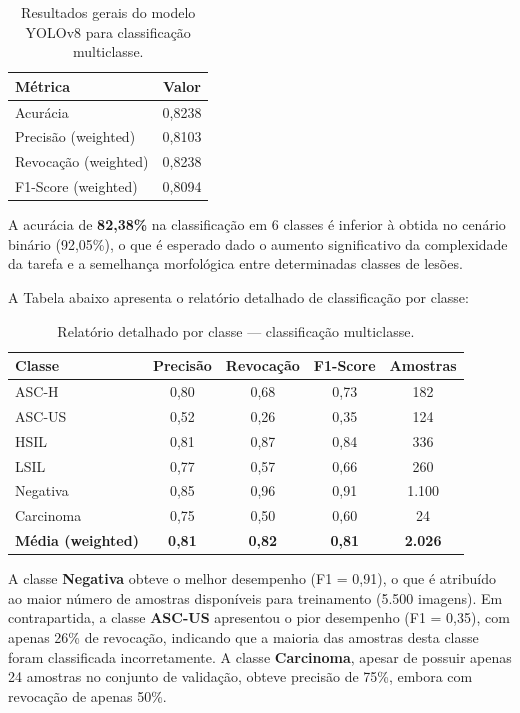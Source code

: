 \documentclass[12pt, a4paper]{article}
\begin{document}
\begin{table}[H]
\centering
\caption{Resultados gerais do modelo YOLOv8 para classificação multiclasse.}
\label{tab:res_multi}
\begin{tabular}{lc}
\toprule
\textbf{Métrica} & \textbf{Valor} \\
\midrule
Acurácia              & 0,8238 \\
Precisão (weighted)   & 0,8103 \\
Revocação (weighted)  & 0,8238 \\
F1-Score (weighted)   & 0,8094 \\
\bottomrule
\end{tabular}
\end{table}

A acurácia de \textbf{82,38\%} na classificação em 6 classes é inferior à obtida no cenário binário (92,05\%), o que é esperado dado o aumento significativo da complexidade da tarefa e a semelhança morfológica entre determinadas classes de lesões.

A Tabela abaixo apresenta o relatório detalhado de classificação por classe:

\begin{table}[H]
\centering
\caption{Relatório detalhado por classe --- classificação multiclasse.}
\label{tab:detalhado_multi}
\begin{tabular}{lcccc}
\toprule
\textbf{Classe} & \textbf{Precisão} & \textbf{Revocação} & \textbf{F1-Score} & \textbf{Amostras} \\
\midrule
ASC-H     & 0,80 & 0,68 & 0,73 & 182 \\
ASC-US    & 0,52 & 0,26 & 0,35 & 124 \\
HSIL      & 0,81 & 0,87 & 0,84 & 336 \\
LSIL      & 0,77 & 0,57 & 0,66 & 260 \\
Negativa  & 0,85 & 0,96 & 0,91 & 1.100 \\
Carcinoma & 0,75 & 0,50 & 0,60 & 24 \\
\midrule
\textbf{Média (weighted)} & \textbf{0,81} & \textbf{0,82} & \textbf{0,81} & \textbf{2.026} \\
\bottomrule
\end{tabular}
\end{table}

A classe \textbf{Negativa} obteve o melhor desempenho (F1 = 0,91), o que é atribuído ao maior número de amostras disponíveis para treinamento (5.500 imagens). Em contrapartida, a classe \textbf{ASC-US} apresentou o pior desempenho (F1 = 0,35), com apenas 26\% de revocação, indicando que a maioria das amostras desta classe foram classificada incorretamente. A classe \textbf{Carcinoma}, apesar de possuir apenas 24 amostras no conjunto de validação, obteve precisão de 75\%, embora com revocação de apenas 50\%.
\end{document}
